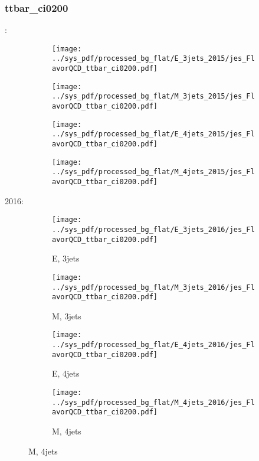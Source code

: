 \documentclass{beamer}
\begin{document}
\begin{frame}
\frametitle{ttbar_ci0200}
\fontsize{5}{1}:
\begin{figure}
\centering
\begin{subfigure}[b]{0.24\textwidth}
\texttt{[image: ../sys\_pdf/processed\_bg\_flat/E\_3jets\_2015/jes\_FlavorQCD\_ttbar\_ci0200.pdf]}
\end{subfigure}
\begin{subfigure}[b]{0.24\textwidth}
\texttt{[image: ../sys\_pdf/processed\_bg\_flat/M\_3jets\_2015/jes\_FlavorQCD\_ttbar\_ci0200.pdf]}
\end{subfigure}
\begin{subfigure}[b]{0.24\textwidth}
\texttt{[image: ../sys\_pdf/processed\_bg\_flat/E\_4jets\_2015/jes\_FlavorQCD\_ttbar\_ci0200.pdf]}
\end{subfigure}
\begin{subfigure}[b]{0.24\textwidth}
\texttt{[image: ../sys\_pdf/processed\_bg\_flat/M\_4jets\_2015/jes\_FlavorQCD\_ttbar\_ci0200.pdf]}
\end{subfigure}
\end{figure}
2016:
\begin{figure}
\centering
\begin{subfigure}[b]{0.24\textwidth}
\texttt{[image: ../sys\_pdf/processed\_bg\_flat/E\_3jets\_2016/jes\_FlavorQCD\_ttbar\_ci0200.pdf]}
\captionsetup{font=tiny}
\caption{E, 3jets}
\end{subfigure}
\begin{subfigure}[b]{0.24\textwidth}
\texttt{[image: ../sys\_pdf/processed\_bg\_flat/M\_3jets\_2016/jes\_FlavorQCD\_ttbar\_ci0200.pdf]}
\captionsetup{font=tiny}
\caption{M, 3jets}
\end{subfigure}
\begin{subfigure}[b]{0.24\textwidth}
\texttt{[image: ../sys\_pdf/processed\_bg\_flat/E\_4jets\_2016/jes\_FlavorQCD\_ttbar\_ci0200.pdf]}
\captionsetup{font=tiny}
\caption{E, 4jets}
\end{subfigure}
\begin{subfigure}[b]{0.24\textwidth}
\texttt{[image: ../sys\_pdf/processed\_bg\_flat/M\_4jets\_2016/jes\_FlavorQCD\_ttbar\_ci0200.pdf]}
\captionsetup{font=tiny}
\caption{M, 4jets}
\end{subfigure}
\end{figure}
\end{frame}
\end{document}
